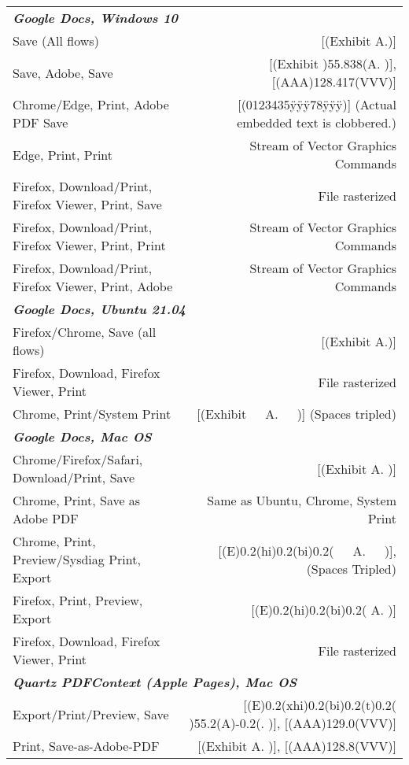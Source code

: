 \begin{tabular}{l@{\hskip -6cm}r}
  \midrule \multicolumn{2}{l}{\emph{\textbf{Google Docs, Windows 10}}} \\
      {Save (All flows)} &
      [(Exhibit A.)] \\
      {Save, Adobe, Save} &
      [(Exhibit )55.838(A. )], [(AAA)128.417(VVV)] \\
      {Chrome/Edge, Print, Adobe PDF Save} &
      [(0123435ÿÿÿ78ÿÿÿ)] (Actual embedded text is clobbered.) \\
      {Edge, Print, Print} &
      Stream of Vector Graphics Commands \\
      {Firefox, Download/Print, Firefox Viewer, Print, Save} &
      File rasterized \\
      {Firefox, Download/Print, Firefox Viewer, Print, Print} &
      Stream of Vector Graphics Commands \\
      {Firefox, Download/Print, Firefox Viewer, Print, Adobe} &
      Stream of Vector Graphics Commands \\
  \midrule \multicolumn{2}{l}{\emph{\textbf{Google Docs, Ubuntu 21.04}}} \\
      {Firefox/Chrome, Save (all flows)} &
      [(Exhibit A.)] \\
      {Firefox, Download, Firefox Viewer, Print} &
      File rasterized \\
      {Chrome, Print/System Print} &
      [(Exhibit\ \ \ A.\ \ \ )] (Spaces tripled) \\
  \midrule \multicolumn{2}{l}{\emph{\textbf{Google Docs, Mac OS}}} \\
      {Chrome/Firefox/Safari, Download/Print, Save} &
      [(Exhibit A. )] \\
      {Chrome, Print, Save as Adobe PDF} &
      Same as Ubuntu, Chrome, System Print \\
      {Chrome, Print, Preview/Sysdiag Print, Export} &
      [(E)0.2(hi)0.2(bi)0.2(\ \ \ A.\ \ \ )], (Spaces Tripled) \\ 
      {Firefox, Print, Preview, Export} &
      [(E)0.2(hi)0.2(bi)0.2( A. )] \\
      {Firefox, Download, Firefox Viewer, Print} &
      File rasterized \\
  \midrule \multicolumn{2}{l}{\emph{\textbf{Quartz PDFContext (Apple Pages), Mac OS}}} \\
      {Export/Print/Preview, Save} &
      [(E)0.2(xhi)0.2(bi)0.2(t)0.2( )55.2(A)-0.2(. )], [(AAA)129.0(VVV)] \\
      {Print, Save-as-Adobe-PDF} &
      [(Exhibit A. )], [(AAA)128.8(VVV)] \\

\end{tabular}
